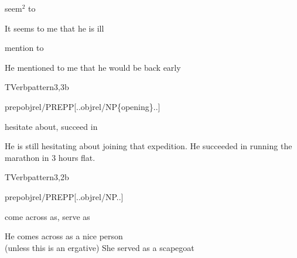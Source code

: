 
\begin{thetadescr}
\evitem seem$^{2}$ to
\esitem
     \begin{examples}
        \example It seems to me that he is ill
     \end{examples}
\end{thetadescr}



\begin{thetadescr}
\evitem mention to
\esitem
     \begin{examples}
        \example He mentioned to me that he would be back early
     \end{examples}
\end{thetadescr}


\newpage
\verbpattern{[synPREPOPENGERUND]}
\begin{vpattern}
 TVerbpattern3,3b   
\csritem \mbox{}\\
     \begin{csr}
     prepobjrel/PREPP[..objrel/NP\{opening\}..]
     \end{csr}
\remarksitem 
\end{vpattern}


\begin{thetadescr}
\evitem hesitate about, succeed in
\esitem
     \begin{examples}
        \example He is still hesitating about joining that expedition.
        \example He succeeded in running the marathon in 3 hours flat.
     \end{examples}
\end{thetadescr}


\newpage
\verbpattern{[synPREPOPENNPPROP]}
\begin{vpattern}
 TVerbpattern3,2b   
\csritem \mbox{}\\
     \begin{csr}
     prepobjrel/PREPP[..objrel/NP..]
     \end{csr}
\remarksitem 
\end{vpattern}


\begin{thetadescr}
\evitem come across as, serve as
\esitem
     \begin{examples}
        \example He comes across as a nice person\\
                 (unless this is an ergative)
        \example She served as a scapegoat
     \end{examples}
\end{thetadescr}


